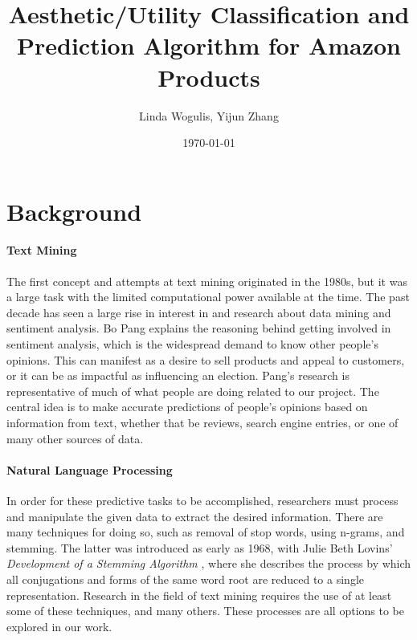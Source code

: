 \documentclass[dvips,12pt]{article}
\begin{document}

\title{\textbf{Aesthetic/Utility Classification and Prediction Algorithm for Amazon Products}}
\author{Linda Wogulis, Yijun Zhang}
\date{\today}



\maketitle


\section{Background}


\paragraph{Text Mining}
The first concept and attempts at text mining originated in the 1980s, but it was a large task with the limited computational power available at the time. The past decade has seen a large rise in interest in and research about data mining and sentiment analysis. Bo Pang\cite{pang2008opinion} explains the reasoning behind getting involved in sentiment analysis, which is the widespread demand to know other people's opinions. This can manifest as a desire to sell products and appeal to customers, or it can be as impactful as influencing an election. Pang's research is representative of much of what people are doing related to our project. The central idea is to make accurate predictions of people's opinions based on information from text, whether that be reviews, search engine entries, or one of many other sources of data. 

\paragraph{Natural Language Processing}
	In order for these predictive tasks to be accomplished, researchers must process and manipulate the given data to extract the desired information. There are many techniques for doing so, such as removal of stop words, using n-grams, and stemming. The latter was introduced as early as 1968, with Julie Beth Lovins' \textit{Development of a Stemming Algorithm} \cite{lovins1968development}, where she describes the process by which all conjugations and forms of the same word root are reduced to a single representation. Research in the field of text mining requires the use of at least some of these techniques, and many others. These processes are all options to be explored in our work.
\end{document}
